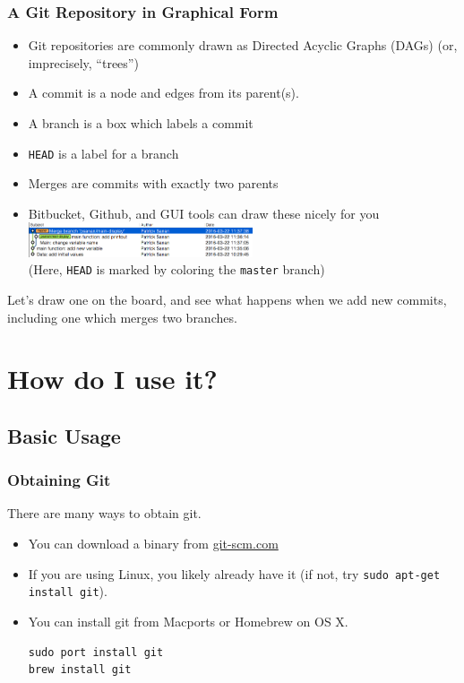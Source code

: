 \documentclass{beamer}
\begin{document}
\begin{frame}[fragile]
\frametitle{A Git Repository in Graphical Form}
\begin{itemize}
\item Git repositories are commonly drawn as Directed Acyclic Graphs (DAGs) (or, imprecisely, ``trees'')
\item A commit is a node and edges from its parent(s). 
\item A branch is a box which labels a commit
\item \texttt{HEAD} is a label for a branch
\item Merges are commits with exactly two parents
\item Bitbucket, Github, and GUI tools can draw these nicely for you
\includegraphics[width=250px]{gitx.png}\\
(Here, \texttt{HEAD} is marked by coloring the \texttt{master} branch)
\end{itemize}
Let's draw one on the board, and see what happens when we add new commits, including one which merges two branches.
\end{frame}

\section{How do I use it?}

\subsection{Basic Usage}
\begin{frame}[fragile]
\frametitle{Obtaining Git}
There are many ways to obtain git. 
\begin{itemize}
  \item You can download a binary from \href{http://git-scm.com}{git-scm.com}
\item If you are using Linux, you likely already have it (if not, try \lstinline{sudo apt-get install git}).
\item You can install git from Macports or Homebrew on OS X.
\begin{lstlisting}
sudo port install git
brew install git
\end{lstlisting}

\end{itemize}
\end{frame}
\end{document}
